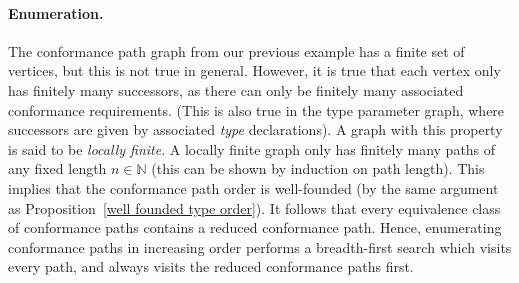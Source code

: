 \documentclass[../generics]{subfiles}
\begin{document}
\paragraph{Enumeration.} The conformance path graph from our previous example has a finite set of vertices, but this is not true in general. However, it is true that each vertex only has finitely many successors, as there can only be finitely many associated conformance requirements. (This is also true in the type parameter graph, where successors are given by associated \emph{type} declarations). A graph with this property is said to be \emph{locally finite}. A locally finite graph only has finitely many paths of any fixed length $n\in\mathbb{N}$ (this can be shown by induction on path length). This implies that the conformance path order is well-founded (by the same argument as Proposition~\ref{well founded type order}). It follows that every equivalence class of conformance paths contains a reduced conformance path. Hence, enumerating conformance paths in increasing order performs a breadth-first search which visits every path, and always visits the reduced conformance paths first.
\end{document}
